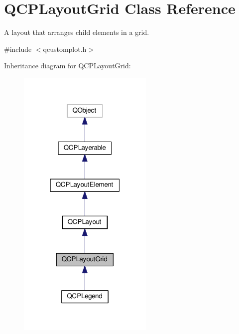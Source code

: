 \hypertarget{classQCPLayoutGrid}{}\section{Q\+C\+P\+Layout\+Grid Class Reference}
\label{classQCPLayoutGrid}


A layout that arranges child elements in a grid.  




{\ttfamily \#include $<$qcustomplot.\+h$>$}



Inheritance diagram for Q\+C\+P\+Layout\+Grid\+:
\nopagebreak
\begin{figure}[H]
\begin{center}
\leavevmode
\includegraphics[width=184pt]{classQCPLayoutGrid__inherit__graph}
\end{center}
\end{figure}


